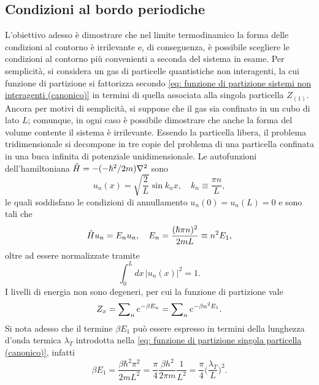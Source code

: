 \subsection{Condizioni al bordo periodiche}
L'obiettivo adesso è dimostrare che nel limite termodinamico la forma delle condizioni al contorno è irrilevante e, di conseguenza, è possibile scegliere le condizioni al contorno più convenienti a seconda del sistema in esame. Per semplicità, si considera un gas di particelle quantistiche non interagenti, la cui funzione di partizione si fattorizza secondo \eqref{eq: funzione di partizione sistemi non interagenti (canonico)} in termini di quella associata alla singola particella $Z_{(1)}$. Ancora per motivi di semplicità, si suppone che il gas sia confinato in un cubo di lato $L$; comunque, in ogni caso è possibile dimostrare che anche la forma del volume contente il sistema è irrilevante. Essendo la particella libera, il problema tridimensionale si decompone in tre copie del problema di una particella confinata in una buca infinita di potenziale unidimensionale. Le autofunzioni dell'hamiltoniana $\hat{H} = -(-\hbar^2/2m)\nabla^2$ sono
\begin{equation}
\label{eq: funzione d'onda stati stazionari buca di potenziale (canonico)}
    u_n(x) = \sqrt{\frac{2}{L}}\sin{k_n x},\quad k_n \equiv \frac{\pi n}{L},
\end{equation}
le quali soddisfano le condizioni di annullamento $u_n(0) = u_n(L) = 0$ e sono tali che 
\begin{equation}
\label{eq: energie stati stazionari buca di potenziale (canonico)}
    \hat{H} u_n = E_nu_n,\quad E_n = \frac{(\hbar\pi n)^2}{2mL} \equiv n^2 E_1,
\end{equation}
oltre ad essere normalizzate tramite
\begin{equation}
    \int_0^L dx\,|u_n(x)|^2 = 1.
\end{equation}
I livelli di energia non sono degeneri, per cui la funzione di partizione vale
\begin{equation}
\label{eq: funzione di partizione particella buca di potenziale (canonico)}
    Z_x = \sum\nolimits_n e^{-\beta E_n} = \sum\nolimits_n e^{-\beta n^2E_1}.
\end{equation}
Si nota adesso che il termine $\beta E_1$ può essere espresso in termini della lunghezza d'onda termica $\lambda_T$ introdotta nella \eqref{eq: funzione di partizione singola particella (canonico)}, infatti
\begin{equation}
    \beta E_1 = \frac{\beta\hbar^2\pi^2}{2mL^2} = \frac{\pi}{4}\frac{\beta h^2}{2\pi m}\frac{1}{L^2} = \frac{\pi}{4}\bigg(\frac{\lambda_T}{L}\bigg)^2.    
\end{equation}
